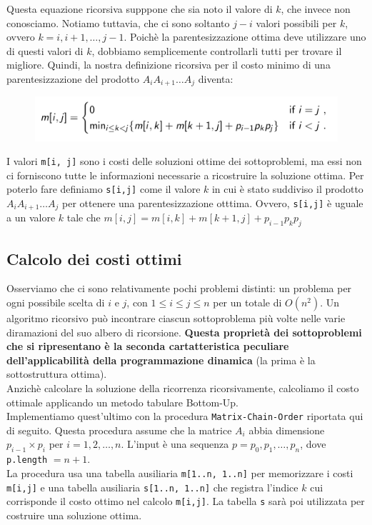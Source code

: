 Questa equazione ricorsiva supppone che sia noto il valore di $k$, che
invece non conosciamo. Notiamo tuttavia, che ci sono soltanto $j-i$
valori possibili per $k$, ovvero $k=i, i+1, \ldots, j-1$. Poichè la
parentesizzazione ottima deve utilizzare uno di questi valori di $k$,
dobbiamo semplicemente controllarli tutti per trovare il migliore.
Quindi, la nostra definizione ricorsiva per il costo minimo di una
parentesizzazione del prodotto $A_i A_{i+1} \ldots A_j$ diventa:

\begin{figure}[H]
  \centering
  \includegraphics[width=15cm, keepaspectratio]{capitoli/programmazione_dinamica/imgs/matrix2.png}
\end{figure}

I valori \texttt{m[i,\ j]} sono i costi delle soluzioni ottime dei
sottoproblemi, ma essi non ci forniscono tutte le informazioni
necessarie a ricostruire la soluzione ottima. Per poterlo fare definiamo
\texttt{s[i,j]} come il valore $k$ in cui è stato suddiviso il
prodotto $A_{i} A_{i+1} \ldots A_j$ per ottenere una parentesizzazione
otttima. Ovvero, \texttt{s[i,j]} è uguale a un valore $k$ tale che
$m[i,j] = m[i,k] + m[k+1,j] + p_{i-1} p_k p_j$

\subsection{Calcolo dei costi ottimi}

Osserviamo che ci sono relativamente pochi problemi distinti: un
problema per ogni possibile scelta di $i$ e $j$, con
$1 \le i \le j \le n$ per un totale di $O(n^2)$. Un algoritmo
ricorsivo può incontrare ciascun sottoproblema più volte nelle varie
diramazioni del suo albero di ricorsione. \textbf{Questa proprietà dei
  sottoproblemi che si ripresentano è la seconda cartatteristica peculiare
  dell'applicabilità della programmazione dinamica} (la prima è la
sottostruttura ottima).\\

Anzichè calcolare la soluzione della ricorrenza ricorsivamente,
calcoliamo il costo ottimale applicando un metodo tabulare Bottom-Up.\\
Implementiamo quest'ultimo con la procedura \texttt{Matrix-Chain-Order}
riportata qui di seguito. Questa procedura assume che la matrice $A_i$
abbia dimensione $p_{i-1} \times p_i$ per $i=1,2,\ldots,n$. L'input è una
sequenza $p = p_0, p_1, \ldots, p_n$, dove \texttt{p.length} $= n+1$.\\
La procedura usa una tabella ausiliaria \texttt{m[1..n,\ 1..n]} per
memorizzare i costi \texttt{m[i,j]} e una tabella ausiliaria
\texttt{s[1..n,\ 1..n]} che registra l'indice $k$ cui corrisponde
il costo ottimo nel calcolo \texttt{m[i,j]}. La tabella \texttt{s}
sarà poi utilizzata per costruire una soluzione ottima.\\


